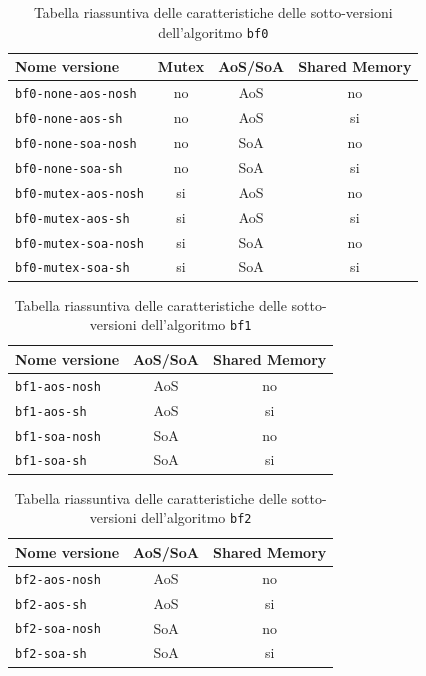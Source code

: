 \documentclass[12pt,a4paper]{book} %
\begin{document}
	\begin{table}[!ht]
		\centering
		\begin{tabular}{|l|c|c|c|}
			\hline
			\textbf{Nome versione} & \textbf{Mutex} & \textbf{AoS/SoA} & \textbf{Shared Memory} \\ \hline
			\texttt{bf0-none-aos-nosh}  & no & AoS & no \\ \hline
			\texttt{bf0-none-aos-sh}    & no & AoS & si \\ \hline
			\texttt{bf0-none-soa-nosh}  & no & SoA & no \\ \hline
			\texttt{bf0-none-soa-sh}    & no & SoA & si \\ \hline
			\texttt{bf0-mutex-aos-nosh} & si & AoS & no \\ \hline
			\texttt{bf0-mutex-aos-sh}   & si & AoS & si \\ \hline
			\texttt{bf0-mutex-soa-nosh} & si & SoA & no \\ \hline
			\texttt{bf0-mutex-soa-sh}   & si & SoA & si \\ \hline
		\end{tabular}
		\label{tab:riassunto_bf0}
		\caption{Tabella riassuntiva delle caratteristiche delle sotto-versioni dell'algoritmo \texttt{bf0}}
	\end{table}

	\begin{table}[!ht]
		\centering
		\begin{tabular}{|l|c|c|}
			\hline
			\textbf{Nome versione} & \textbf{AoS/SoA} & \textbf{Shared Memory} \\ \hline
			\texttt{bf1-aos-nosh}  & AoS & no \\ \hline
			\texttt{bf1-aos-sh}    & AoS & si \\ \hline
			\texttt{bf1-soa-nosh}  & SoA & no \\ \hline
			\texttt{bf1-soa-sh}    & SoA & si \\ \hline
		\end{tabular}
		\label{tab:riassunto_bf1}
		\caption{Tabella riassuntiva delle caratteristiche delle sotto-versioni dell'algoritmo \texttt{bf1}}
	\end{table}

	\begin{table}[!ht]
		\centering
		\begin{tabular}{|l|c|c|}
			\hline
			\textbf{Nome versione} & \textbf{AoS/SoA} & \textbf{Shared Memory} \\ \hline
			\texttt{bf2-aos-nosh}  & AoS & no \\ \hline
			\texttt{bf2-aos-sh}    & AoS & si \\ \hline
			\texttt{bf2-soa-nosh}  & SoA & no \\ \hline
			\texttt{bf2-soa-sh}    & SoA & si \\ \hline
		\end{tabular}
		\label{tab:riassunto_bf2}
		\caption{Tabella riassuntiva delle caratteristiche delle sotto-versioni dell'algoritmo \texttt{bf2}}
	\end{table}
	
\end{document}
